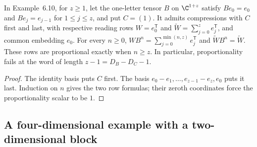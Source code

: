 \begin{lemma}
    \label{lem:asym_example_sharp_bound}
    \leanok
    In Example~6.10, for $z\geq1$, let the one-letter tensor $B$ on $\C^{1+z}$ satisfy
    $Be_0=e_0$ and $Be_j=e_{j-1}$ for $1\leq j\leq z$, and put $C=(1)$.
    It admits compressions with $C$ first and last, with respective reading
    rows $W=e_0^{\mathsf T}$ and
    $\widetilde W=\sum_{j=0}^z e_j^{\mathsf T}$, and common embedding $e_0$.
    For every $n\geq0$,
    $WB^n=\sum_{j=0}^{\min(n,z)}e_j^{\mathsf T}$ and
    $\widetilde WB^n=\widetilde W$. These rows are proportional exactly when
    $n\geq z$. In particular, proportionality fails at the word of length
    $z-1=D_B-D_C-1$.
\end{lemma}

\begin{proof}
    \leanok
    The identity basis puts $C$ first. The basis
    $e_0-e_1,\ldots,e_{z-1}-e_z,e_0$ puts it last.
    Induction on $n$ gives the two row formulas; their zeroth coordinates
    force the proportionality scalar to be $1$.
\end{proof}

\subsection{A four-dimensional example with a two-dimensional block}

